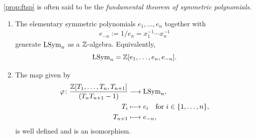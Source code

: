 \documentclass[11pt]{amsart}
\begin{document}
\cref{prop:ftsp} is often said to be the \textit{fundamental theorem of symmetric polynomials}. 

\begin{theo}\label{theo:gene_n}
\begin{enumerate}
    \item\label{theo3.3a} The elementary symmetric polynomials \(e_1,\dots,e_n\) together with 
    \begin{align}
        e_{-n} := 1/e_n = x_1^{-1}\cdots x_n^{-1}
        \label{eq:e_n=1}
    \end{align}
    generate $\mathrm{LSym}_n$ as a $\mathbb{Z}$-algebra. Equivalently,
    \[\mathrm{LSym}_n=\mathbb{Z}[e_1, \dots, e_n, e_{-n}].\]

    \item\label{theo3.3b} The map given by
    \begin{align*}
        \varphi \colon \frac{\mathbb{Z}[T_1,\dots,T_n,T_{n + 1}]}{(T_n T_{n + 1} - 1)} &\longrightarrow \mathrm{LSym}_n, \\
        T_i &\longmapsto e_i \quad \text{for }i \in \{ 1,\dots,n\}, \\
        T_{n+1} &\longmapsto e_{-n},
    \end{align*}
    is well defined and is an isomorphism.
\end{enumerate}
\end{theo}
\end{document}
